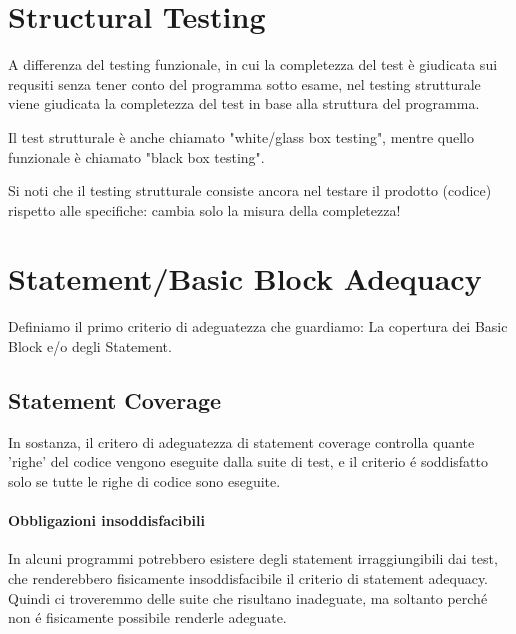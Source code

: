 
\section{Structural Testing}
A differenza del testing funzionale, in cui la completezza del test è giudicata sui requsiti senza tener conto del programma sotto esame,
nel testing strutturale viene giudicata la completezza del test in base alla struttura del programma.

Il test strutturale è anche chiamato "white/glass box testing", mentre quello funzionale è chiamato "black box testing".

Si noti che il testing strutturale consiste ancora nel testare il prodotto (codice) rispetto alle specifiche: cambia solo la misura della completezza!



\section{Statement/Basic Block Adequacy}
Definiamo il primo criterio di adeguatezza che guardiamo: La copertura dei Basic Block e/o degli Statement.

\subsection{Statement Coverage}

In sostanza, il critero di adeguatezza di statement coverage controlla quante 'righe' del codice vengono eseguite dalla suite di test, e il criterio é soddisfatto solo se tutte le righe di codice sono eseguite.

\paragraph*{Obbligazioni insoddisfacibili}
In alcuni programmi potrebbero esistere degli statement irraggiungibili dai test, che renderebbero fisicamente insoddisfacibile il criterio di statement adequacy.
Quindi ci troveremmo delle suite che risultano inadeguate, ma soltanto perché non é fisicamente possibile renderle adeguate.

